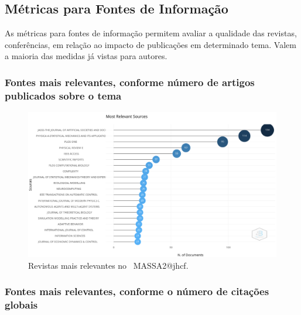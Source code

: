 \subsection{Métricas para Fontes de Informação}

As métricas para fontes de informação permitem avaliar a qualidade das revistas, conferências, em relação ao impacto de publicações em determinado tema. Valem a maioria das medidas já vistas para autores.

\subsubsection{Fontes mais relevantes, conforme número de artigos publicados sobre o tema}

\begin{figure}
    \centering
    \includegraphics[width=1\textwidth]{exploratory-data-analysis/jhcf/PesqBibliogr/SimulacaoMultiagente/WoS-20220203/Metricas/Sources/MASSA2-Most-Relevant-Sources.png}
    \caption{Revistas mais relevantes no  \dataset\ MASSA2@jhcf.}
    \label{fig:MASSA2-Most-Relevant-Sources}
\end{figure}

\subsubsection{Fontes mais relevantes, conforme o número de citações globais}

